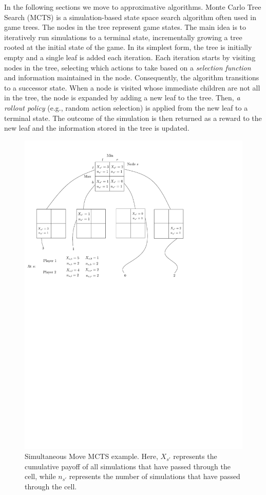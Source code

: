 In the following sections we move to approximative algorithms.
Monte Carlo Tree Search (MCTS) is a simulation-based state space search algorithm often used
in game trees. The nodes in the tree represent game states. The main idea is to iteratively run
simulations to a terminal state, incrementally growing a tree rooted at the initial state of the game. In
its simplest form, the tree is initially empty and a single leaf is added each iteration. Each iteration
starts by visiting nodes in the tree, selecting which actions to take based on a \emph{selection function} and
information maintained in the node. Consequently, the algorithm transitions to a successor state. When a
node is visited whose immediate children are not all in the tree, the node is expanded by adding a
new leaf to the tree. Then, \emph{a rollout policy} (e.g., random action selection) is applied from the new
leaf to a terminal state. The outcome of the simulation is then returned as a reward to the new leaf
and the information stored in the tree is updated.

\begin{figure}[t]
\centering
\includegraphics[scale=0.7]{figures/smmcts-example}
\caption{Simultaneous Move MCTS example. 
Here, $X_{s'}$ represents the cumulative payoff of all simulations that have passed 
through the cell, while $n_{s'}$ represents the number of simulations that have passed through the cell.} 
\label{fig:smmcts-example}
\end{figure}

